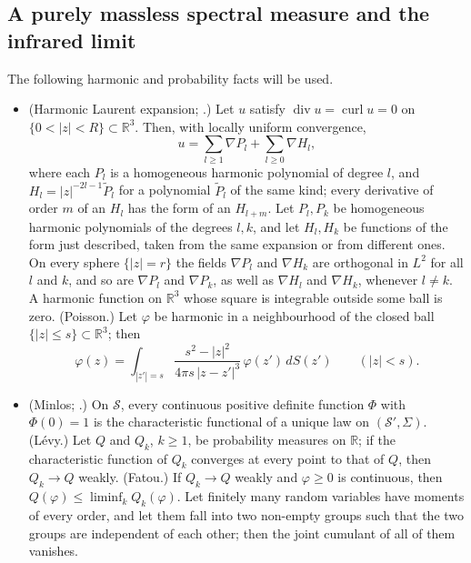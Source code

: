 \documentclass[11pt,letterpaper,reqno]{amsart}
\theoremstyle{definition}
\begin{document}
\subsection{A purely massless spectral measure and the infrared limit}
The following harmonic and probability facts will be used.
\begin{itemize}
\item[(K20)] (Harmonic Laurent expansion; \cite[Theorems~10.1 and~1.21; Chapter~5]{AxlerBourdonRamey}.) Let $u$ satisfy $\operatorname{div}u=\operatorname{curl}u=0$ on $\{0<|z|<R\}\subset\mathbb R^3$.
Then, with locally uniform convergence,
\begin{equation*}
u=\sum_{l\ge1}\nabla P_l+\sum_{l\ge0}\nabla H_l,
\end{equation*}
where each $P_l$ is a homogeneous harmonic polynomial of degree $l$, and $H_l=|z|^{-2l-1}\tilde P_l$ for a polynomial $\tilde P_l$ of the same kind;
every derivative of order $m$ of an $H_l$ has the form of an $H_{l+m}$.
Let $P_l,P_k$ be homogeneous harmonic polynomials of the degrees $l,k$, and let $H_l,H_k$ be functions of the form just described, taken from the same expansion or from different ones.
On every sphere $\{|z|=r\}$ the fields $\nabla P_l$ and $\nabla H_k$ are orthogonal in $L^2$ for all $l$ and $k$, and so are $\nabla P_l$ and $\nabla P_k$, as well as $\nabla H_l$ and $\nabla H_k$, whenever $l\ne k$.
A harmonic function on $\mathbb R^3$ whose square is integrable outside some ball is zero.
(Poisson.) Let $\varphi$ be harmonic in a neighbourhood of the closed ball $\{|z|\le s\}\subset\mathbb R^3$;
then
\begin{equation*}
\varphi(z)=\int_{|z'|=s}\frac{s^2-|z|^2}{4\pi s\,|z-z'|^3}\,\varphi(z')\,dS(z')\qquad(|z|<s).
\end{equation*}
\item[(K21)] (Minlos; \cite[Theorem~1]{FageotAminiUnser2014}.) On $\mathcal S$, every continuous positive definite function $\Phi$ with $\Phi(0)=1$ is the characteristic functional of a unique law on $(\mathcal S',\Sigma)$.
(L\'evy.) Let $Q$ and $Q_k$, $k\ge1$, be probability measures on $\mathbb R$;
if the characteristic function of $Q_k$ converges at every point to that of $Q$, then $Q_k\to Q$ weakly.
(Fatou.) If $Q_k\to Q$ weakly and $\varphi\ge0$ is continuous, then $Q(\varphi)\le\liminf_kQ_k(\varphi)$.
Let finitely many random variables have moments of every order, and let them fall into two non-empty groups such that the two groups are independent of each other;
then the joint cumulant of all of them vanishes.
\end{itemize}
\end{document}
